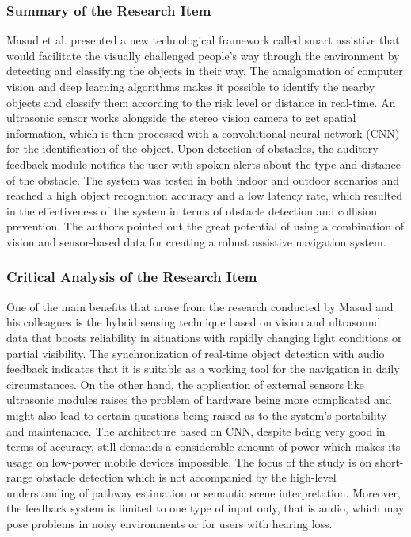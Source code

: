 \documentclass{FastFyp}
\begin{document}
\subsubsection{Summary of the Research Item}
Masud et al. \cite{ref:masud2022smart} presented a new technological framework called smart assistive that would facilitate the visually challenged people's way through the environment by detecting and classifying the objects in their way. The amalgamation of computer vision and deep learning algorithms makes it possible to identify the nearby objects and classify them according to the risk level or distance in real-time. An ultrasonic sensor works alongside the stereo vision camera to get spatial information, which is then processed with a convolutional neural network (CNN) for the identification of the object. Upon detection of obstacles, the auditory feedback module notifies the user with spoken alerts about the type and distance of the obstacle. The system was tested in both indoor and outdoor scenarios and reached a high object recognition accuracy and a low latency rate, which resulted in the effectiveness of the system in terms of obstacle detection and collision prevention. The authors pointed out the great potential of using a combination of vision and sensor-based data for creating a robust assistive navigation system.

\subsubsection{Critical Analysis of the Research Item}

One of the main benefits that arose from the research conducted by Masud and his colleagues is the hybrid sensing technique based on vision and ultrasound data that boosts reliability in situations with rapidly changing light conditions or partial visibility. The synchronization of real-time object detection with audio feedback indicates that it is suitable as a working tool for the navigation in daily circumstances. On the other hand, the application of external sensors like ultrasonic modules raises the problem of hardware being more complicated and might also lead to certain questions being raised as to the system's portability and maintenance. The architecture based on CNN, despite being very good in terms of accuracy, still demands a considerable amount of power which makes its usage on low-power mobile devices impossible. The focus of the study is on short-range obstacle detection which is not accompanied by the high-level understanding of pathway estimation or semantic scene interpretation. Moreover, the feedback system is limited to one type of input only, that is audio, which may pose problems in noisy environments or for users with hearing loss.
\end{document}
